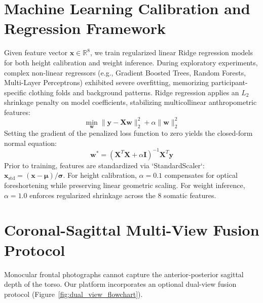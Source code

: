 \documentclass[12pt,a4paper,oneside]{report}
\begin{document}
\section{Machine Learning Calibration and Regression Framework}
Given feature vector $\mathbf{x} \in \mathbb{R}^8$, we train regularized linear Ridge regression models for both height calibration and weight inference. During exploratory experiments, complex non-linear regressors (e.g., Gradient Boosted Trees, Random Forests, Multi-Layer Perceptrons) exhibited severe overfitting, memorizing participant-specific clothing folds and background patterns. Ridge regression applies an $L_2$ shrinkage penalty on model coefficients, stabilizing multicollinear anthropometric features:
\begin{equation}
\min_{\mathbf{w}} \|\mathbf{y} - \mathbf{X}\mathbf{w}\|_2^2 + \alpha \|\mathbf{w}\|_2^2
\end{equation}
Setting the gradient of the penalized loss function to zero yields the closed-form normal equation:
\begin{equation}
\mathbf{w}^* = (\mathbf{X}^T\mathbf{X} + \alpha \mathbf{I})^{-1}\mathbf{X}^T\mathbf{y}
\end{equation}
Prior to training, features are standardized via `StandardScaler`: $\mathbf{x}_{\text{std}} = (\mathbf{x} - \boldsymbol{\mu}) / \boldsymbol{\sigma}$. For height calibration, $\alpha = 0.1$ compensates for optical foreshortening while preserving linear geometric scaling. For weight inference, $\alpha = 1.0$ enforces regularized shrinkage across the 8 somatic features.

\section{Coronal-Sagittal Multi-View Fusion Protocol}
Monocular frontal photographs cannot capture the anterior-posterior sagittal depth of the torso. Our platform incorporates an optional dual-view fusion protocol (Figure~\ref{fig:dual_view_flowchart}).
\end{document}
